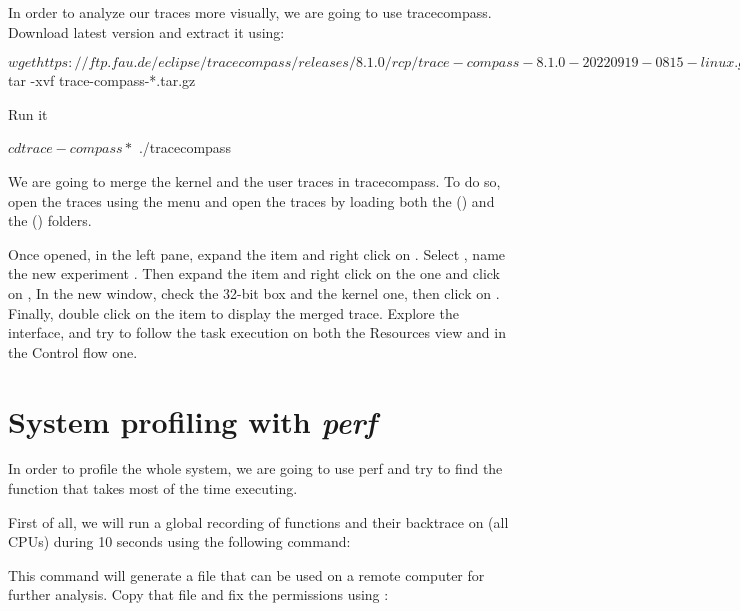 In order to analyze our traces more visually, we are going to use tracecompass.
Download  latest version and extract it using:

\begin{bashinput}
$ wget https://ftp.fau.de/eclipse/tracecompass/releases/8.1.0/rcp/trace-compass-8.1.0-20220919-0815-linux.gtk.x86_64.tar.gz
$ tar -xvf trace-compass-*.tar.gz
\end{bashinput}

Run it
\begin{bashinput}
$ cd trace-compass*
$ ./tracecompass
\end{bashinput}

We are going to merge the kernel and the user traces in tracecompass. To do so,
open the traces using the  menu and open the traces
by loading both the  () and the 
() folders.

Once opened, in the left pane, expand the  item and right click
on . Select , name the new experiment
. Then expand the  item and right click on
the  one and click on , In the new
window, check the 32-bit box and the kernel one, then click on .
Finally, double click on the  item to display the merged
trace. Explore the interface, and try to follow the task execution on both the
Resources view and in the Control flow one.

\section{System profiling with {\em perf}}

In order to profile the whole system, we are going to use perf and try to find
the function that takes most of the time executing.

First of all, we will run a global recording of functions and their backtrace on
(all CPUs) during 10 seconds using the following command:


This command will generate a  file that can be used on a remote
computer for further analysis. Copy that file and fix the permissions using
:

